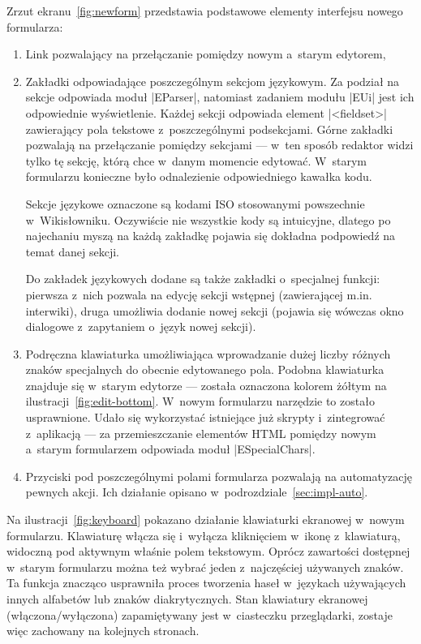 Zrzut ekranu~\ref{fig:newform} przedstawia podstawowe elementy interfejsu nowego formularza:
\begin{enumerate}
\item Link pozwalający na przełączanie pomiędzy nowym a~starym edytorem,
\item Zakładki odpowiadające poszczególnym sekcjom językowym. Za podział na sekcje odpowiada moduł \kod|EParser|, natomiast zadaniem modułu \kod|EUi| jest ich odpowiednie wyświetlenie. Każdej sekcji odpowiada element \kod|<fieldset>| zawierający pola tekstowe z~poszczególnymi podsekcjami. Górne zakładki pozwalają na przełączanie pomiędzy sekcjami --- w~ten sposób redaktor widzi tylko tę sekcję, którą chce w~danym momencie edytować. W~starym formularzu konieczne było odnalezienie odpowiedniego kawałka kodu.

Sekcje językowe oznaczone są kodami ISO stosowanymi powszechnie w~Wikisłowniku. Oczywiście nie wszystkie kody są intuicyjne, dlatego po najechaniu myszą na każdą zakładkę pojawia się dokładna podpowiedź na temat danej sekcji.

Do zakładek językowych dodane są także zakładki o~specjalnej funkcji: pierwsza z~nich pozwala na edycję sekcji wstępnej (zawierającej m.in. interwiki), druga umożliwia dodanie nowej sekcji (pojawia się wówczas okno dialogowe z~zapytaniem o~język nowej sekcji).
\item Podręczna klawiaturka umożliwiająca wprowadzanie dużej liczby różnych znaków specjalnych do obecnie edytowanego pola. Podobna klawiaturka znajduje się w~starym edytorze --- została oznaczona kolorem żółtym na ilustracji~\ref{fig:edit-bottom}. W~nowym formularzu narzędzie to zostało usprawnione. Udało się wykorzystać istniejące już skrypty i~zintegrować z~aplikacją --- za przemieszczanie elementów HTML pomiędzy nowym a~starym formularzem odpowiada moduł \kod|ESpecialChars|.
\item Przyciski pod poszczególnymi polami formularza pozwalają na automatyzację pewnych akcji. Ich działanie opisano w~podrozdziale~\ref{sec:impl-auto}.
\end{enumerate}


Na ilustracji~\ref{fig:keyboard} pokazano działanie klawiaturki ekranowej w~nowym formularzu. Klawiaturę włącza się i~wyłącza kliknięciem w~ikonę z~klawiaturą, widoczną pod aktywnym właśnie polem tekstowym. Oprócz zawartości dostępnej w~starym formularzu można też wybrać jeden z~najczęściej używanych znaków. Ta funkcja znacząco usprawniła proces tworzenia haseł w~językach używających innych alfabetów lub znaków diakrytycznych. Stan klawiatury ekranowej (włączona/wyłączona) zapamiętywany jest w~ciasteczku przeglądarki, zostaje więc zachowany na kolejnych stronach.

